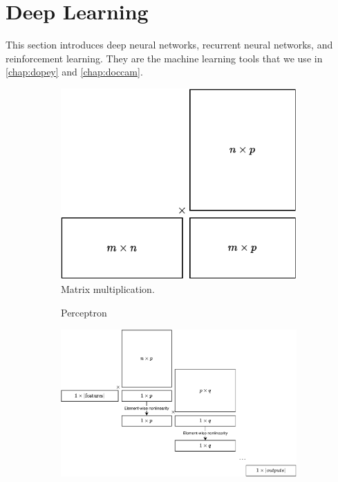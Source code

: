 \section{Deep Learning}
This section introduces deep neural networks, recurrent neural networks, and
reinforcement learning. They are the machine learning tools that we use in
\cref{chap:dopey} and \cref{chap:doccam}.
\begin{figure}[t]
  \centering
  \begin{subfigure}[t]{0.3\textwidth}
    \includegraphics[width=0.99\textwidth]{figures/matmul.pdf}
    \caption{Matrix multiplication.}
    \label{fig:matmul}
	\end{subfigure}
	\begin{subfigure}[t]{0.3\textwidth}
    \caption{Perceptron}
    \label{fig:perceptron}
	\end{subfigure}
	\begin{subfigure}[b]{0.6\textwidth}
    \includegraphics[width=0.99\textwidth]{figures/deep_matmul.pdf}

\end{subfigure}
\end{figure}
